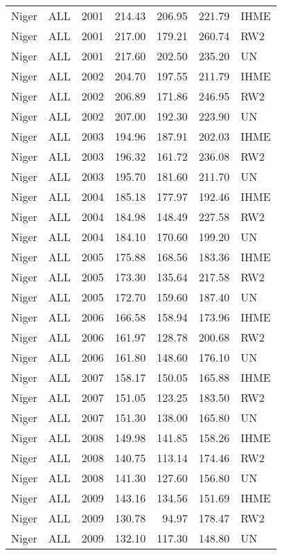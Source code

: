 \begin{longtable}{lllrrrl}
  Niger & ALL & 2001 & 214.43 & 206.95 & 221.79 & IHME \\ 
  Niger & ALL & 2001 & 217.00 & 179.21 & 260.74 & RW2 \\ 
  Niger & ALL & 2001 & 217.60 & 202.50 & 235.20 & UN \\ 
  Niger & ALL & 2002 & 204.70 & 197.55 & 211.79 & IHME \\ 
  Niger & ALL & 2002 & 206.89 & 171.86 & 246.95 & RW2 \\ 
  Niger & ALL & 2002 & 207.00 & 192.30 & 223.90 & UN \\ 
  Niger & ALL & 2003 & 194.96 & 187.91 & 202.03 & IHME \\ 
  Niger & ALL & 2003 & 196.32 & 161.72 & 236.08 & RW2 \\ 
  Niger & ALL & 2003 & 195.70 & 181.60 & 211.70 & UN \\ 
  Niger & ALL & 2004 & 185.18 & 177.97 & 192.46 & IHME \\ 
  Niger & ALL & 2004 & 184.98 & 148.49 & 227.58 & RW2 \\ 
  Niger & ALL & 2004 & 184.10 & 170.60 & 199.20 & UN \\ 
  Niger & ALL & 2005 & 175.88 & 168.56 & 183.36 & IHME \\ 
  Niger & ALL & 2005 & 173.30 & 135.64 & 217.58 & RW2 \\ 
  Niger & ALL & 2005 & 172.70 & 159.60 & 187.40 & UN \\ 
  Niger & ALL & 2006 & 166.58 & 158.94 & 173.96 & IHME \\ 
  Niger & ALL & 2006 & 161.97 & 128.78 & 200.68 & RW2 \\ 
  Niger & ALL & 2006 & 161.80 & 148.60 & 176.10 & UN \\ 
  Niger & ALL & 2007 & 158.17 & 150.05 & 165.88 & IHME \\ 
  Niger & ALL & 2007 & 151.05 & 123.25 & 183.50 & RW2 \\ 
  Niger & ALL & 2007 & 151.30 & 138.00 & 165.80 & UN \\ 
  Niger & ALL & 2008 & 149.98 & 141.85 & 158.26 & IHME \\ 
  Niger & ALL & 2008 & 140.75 & 113.14 & 174.46 & RW2 \\ 
  Niger & ALL & 2008 & 141.30 & 127.60 & 156.80 & UN \\ 
  Niger & ALL & 2009 & 143.16 & 134.56 & 151.69 & IHME \\ 
  Niger & ALL & 2009 & 130.78 & 94.97 & 178.47 & RW2 \\ 
  Niger & ALL & 2009 & 132.10 & 117.30 & 148.80 & UN \\ 

\end{longtable}
